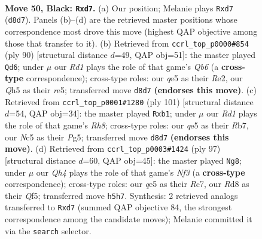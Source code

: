 \documentclass[11pt]{article}
\begin{document}
\clearpage

\begin{figure}[p]\centering
\begin{subfigure}{0.46\textwidth}\centering
\resizebox{\linewidth}{!}{%
\newchessgame
\chessboard[
  setfen={3r2k1/p2P4/1p6/2n1Qp1q/P1p5/6P1/1P6/R4RK1 b - - 2 50},
  showmover=false,
  pgfstyle=straightmove, color=movearrow, markmove={d8-d7}
]}
\caption{}
\end{subfigure}\hfill
\begin{subfigure}{0.46\textwidth}\centering
\resizebox{\linewidth}{!}{%
\newchessgame
\chessboard[
  setfen={4r1k1/7p/1Q3R2/2pPr3/6Pq/1P2p2P/4R1K1/8 w - - 6 46},
  showmover=false,
  pgfstyle=straightmove, color=movearrow, markmove={b6-d6}
]}
\caption{}
\end{subfigure}
\\[4pt]
\begin{subfigure}{0.46\textwidth}\centering
\resizebox{\linewidth}{!}{%
\newchessgame
\chessboard[
  setfen={8/1r4k1/p2p4/3P1Qp1/1PP4q/4KR2/6P1/1R5r b - - 4 51},
  showmover=false,
  pgfstyle=straightmove, color=movearrow, markmove={h1-b1}
]}
\caption{}
\end{subfigure}\hfill
\begin{subfigure}{0.46\textwidth}\centering
\resizebox{\linewidth}{!}{%
\newchessgame
\chessboard[
  setfen={7k/2r3p1/2P2n1p/5q2/8/R3QP2/P7/K1R5 b - - 0 49},
  showmover=false,
  pgfstyle=straightmove, color=movearrow, markmove={f6-g8}
]}
\caption{}
\end{subfigure}
\caption{\textbf{Move 50, Black: \texttt{Rxd7}.} (a) Our position; Melanie plays \texttt{Rxd7} (\texttt{d8d7}). Panels (b)--(d) are the retrieved master positions whose correspondence most drove this move (highest QAP objective among those that transfer to it). (b) Retrieved from \texttt{ccrl\_top\_p0000\#854} (ply 90) [structural distance $d$=49, QAP obj=51]: the master played \texttt{Qd6}; under $\mu$ our \emph{Rd1} plays the role of that game's \emph{Qb6} (a \textbf{cross-type} correspondence); cross-type roles: our \emph{q}e5 as their \emph{R}e2, our \emph{Q}h5 as their \emph{r}e5; transferred move \texttt{d8d7} \textbf{(endorses this move)}. (c) Retrieved from \texttt{ccrl\_top\_p0001\#1280} (ply 101) [structural distance $d$=54, QAP obj=34]: the master played \texttt{Rxb1}; under $\mu$ our \emph{Rd1} plays the role of that game's \emph{Rh8}; cross-type roles: our \emph{q}e5 as their \emph{R}b7, our \emph{N}c5 as their \emph{P}g5; transferred move \texttt{d8d7} \textbf{(endorses this move)}. (d) Retrieved from \texttt{ccrl\_top\_p0003\#1424} (ply 97) [structural distance $d$=60, QAP obj=45]: the master played \texttt{Ng8}; under $\mu$ our \emph{Qh4} plays the role of that game's \emph{Nf3} (a \textbf{cross-type} correspondence); cross-type roles: our \emph{q}e5 as their \emph{R}c7, our \emph{R}d8 as their \emph{Q}f5; transferred move \texttt{h5h7}. Synthesis: 2 retrieved analogs transferred to \texttt{Rxd7} (summed QAP objective 84, the strongest correspondence among the candidate moves); Melanie committed it via the \texttt{search} selector.}
\label{fig:thought-m99}
\end{figure}
\end{document}
